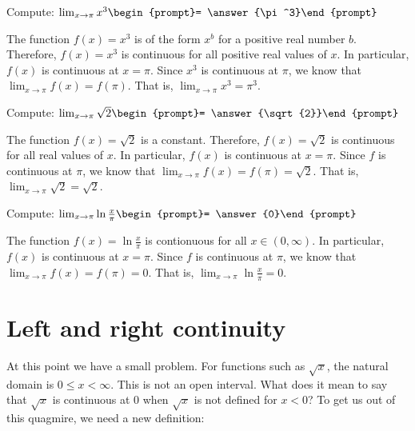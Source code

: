 \documentclass{ximera}
\begin{document}
\begin{question}
  Compute:
  $\lim_{x\to \pi} x^3\begin{prompt}= \answer{\pi^3}\end{prompt}$
  \begin{feedback}
    The function $f(x)=x^3$ is of the form $x^b$ for a positive real number
    $b$.  Therefore, $f(x)=x^3$ is continuous for all positive real values of
    $x$.  In particular, $f(x)$ is continuous at $x=\pi$.  Since $x^3$
    is continuous at $\pi$, we know that $\lim_{x\to \pi} f(x) = f(\pi)$.
    That is, $\lim_{x\to \pi} x^3 = \pi^3$.
  \end{feedback}
\end{question}
\begin{question}
  Compute:
  $\lim_{x\to \pi} \sqrt{2}\begin{prompt}= \answer{\sqrt{2}}\end{prompt}$
  \begin{feedback}
    The function $f(x)= \sqrt{2}$ is a constant.
  Therefore, $f(x)=\sqrt{2}$ is continuous for all real values of
    $x$.  In particular, $f(x)$ is continuous at $x=\pi$.  Since $f$
    is continuous at $\pi$, we know that $\lim_{x\to \pi} f(x) = f(\pi)=\sqrt{2}$.
    That is, $\lim_{x\to \pi} \sqrt{2}= \sqrt{2}$.
  \end{feedback}
\end{question}
\begin{question}
  Compute:
  $\lim_{x\to \pi} \ln{\frac{x}{\pi}}\begin{prompt}= \answer{0}\end{prompt}$
  \begin{feedback}
    The function $f(x)=  \ln{\frac{x}{\pi}}$ is contionuous
 for all $x\in(0,\infty)$.  In particular, $f(x)$ is continuous at $x=\pi$.  Since $f$
    is continuous at $\pi$, we know that $\lim_{x\to \pi} f(x) = f(\pi)=0$.
    That is, $\lim_{x\to \pi} \ln{\frac{x}{\pi}}= 0$.
  \end{feedback}
\end{question}
\section{Left and right continuity}


At this point we have a small problem.  For functions such as
$\sqrt{x}$, the natural domain is $0\leq x <\infty$.  This is not an
open interval.  What does it mean to say that $\sqrt{x}$ is continuous
at $0$ when $\sqrt{x}$ is not defined for $x<0$? To get us out of this
quagmire, we need a new definition:
\end{document}
